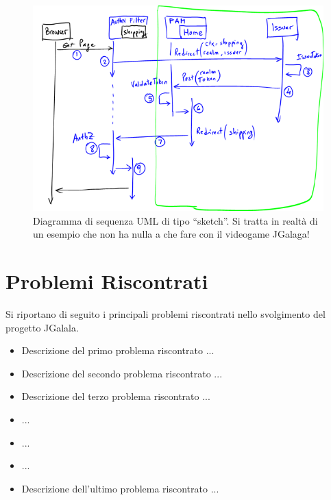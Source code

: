 \documentclass[12pt,a4paper]{report}
\begin{document}
\lipsum[21-22]

\begin{figure}[bt]
  \centering
  \includegraphics[width=.80\linewidth]{controller-sketched.png}
  \caption{Diagramma di sequenza UML di tipo ``sketch''. Si tratta in realt\`a di un esempio che non ha nulla a che fare con il videogame JGalaga!}
  \label{fig:controller-sketched}
\end{figure}

\lipsum[23-24]

\section{Problemi Riscontrati}\label{ch:proris}
\lipsum[25]

Si riportano di seguito i principali problemi riscontrati nello svolgimento del progetto JGalala. 
\begin{itemize}
\item Descrizione del primo problema riscontrato ...
\item Descrizione del secondo problema riscontrato ...
\item Descrizione del terzo problema riscontrato ...
\item ...
\item ...
\item ...
\item Descrizione dell'ultimo problema riscontrato ...
\end{itemize}

\lipsum[26-28]
\end{document}

